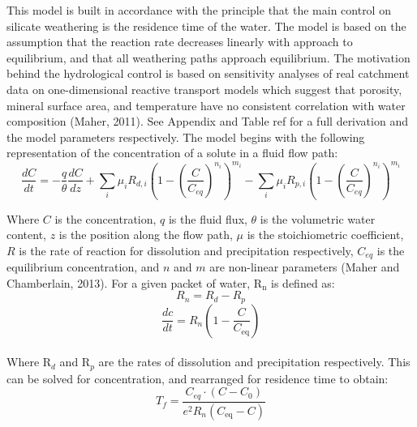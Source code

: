 This model is built in accordance with the principle that the main control on silicate weathering is the residence time of the water. The model is based on the assumption that the reaction rate decreases linearly with approach to equilibrium, and that all weathering paths approach equilibrium. The motivation behind the hydrological control is based on sensitivity analyses of real catchment data on one-dimensional reactive transport models which suggest that porosity, mineral surface area, and temperature have no consistent correlation with water composition (Maher, 2011). See Appendix and Table ref for a full derivation and the model parameters respectively. The model begins with the following representation of the concentration of a solute in a fluid flow path:\\ 

\begin{equation}
    \frac{dC}{dt} = -\frac{q}{\theta} \frac{dC}{dz} + \sum_i \mu_i R_{d,i} \left( 1 - \left( \frac{C}{C_{eq}} \right)^{n_i} \right)^{m_i} - \sum_i \mu_i R_{p,i} \left( 1 - \left( \frac{C}{C_{eq}} \right)^{n_i} \right)^{m_i}
\end{equation}

Where \( C \) is the concentration, \( q \) is the fluid flux, \( \theta \) is the volumetric water content, \( z \) is the position along the flow path, \( \mu \) is the stoichiometric coefficient, \( R \) is the rate of reaction for dissolution and precipitation respectively, \( C_{eq} \) is the equilibrium concentration, and \( n \) and \( m \) are non-linear parameters (Maher and Chamberlain, 2013). For a given packet of water, R$_{\text{n}}$ is defined as: \\

\begin{equation}
R_n = R_{d} - R_{p}
\end{equation} 
\begin{equation}
\frac{dc}{dt} = R_n \left( 1 - \frac{C}{C_{\text{eq}}} \right)
\end{equation} \\

Where R$_d$ and R$_p$ are the rates of dissolution and precipitation respectively. This can be solved for concentration, and rearranged for residence time to obtain:\\

\begin{equation}
    T_f = \frac{C_{eq} \cdot \left(C - C_0\right)}{e^2 R_n \left( C_{\text{eq}} - C \right)}
\end{equation}\\

